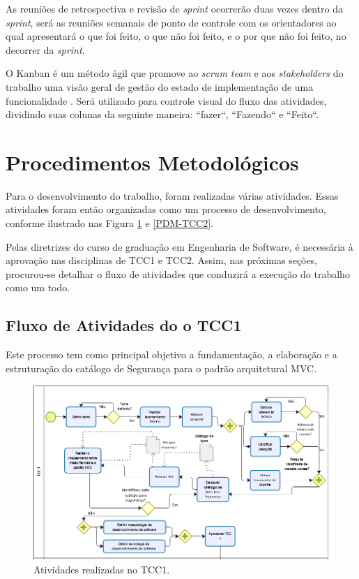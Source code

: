 As reuniões de retrospectiva e revisão de \textit{sprint} ocorrerão duas vezes dentro da \textit{sprint}, será as reuniões semanais   de ponto de controle com os orientadores ao qual apresentará o que foi feito, o que não foi feito, e o por que não foi feito, no decorrer da \textit{sprint}. 

O Kanban é um método ágil que promove ao \textit{scrum team} e aos \textit{stakeholders} do trabalho uma visão geral de gestão do estado de implementação de uma funcionalidade \cite{prikladnicki2014metodos}. Será utilizado para controle visual do fluxo das atividades, dividindo suas colunas da seguinte maneira: ``fazer``, ``Fazendo`` e ``Feito``.

\section{Procedimentos Metodológicos}
\label{sec:procedimentosMetodológicos}

Para o desenvolvimento do trabalho, foram realizadas várias atividades. Essas atividades foram então organizadas como um processo de desenvolvimento, conforme ilustrado nas Figura \ref{PDM-TCC1} e \ref{PDM-TCC2}. 

Pelas diretrizes do curso de graduação em Engenharia de Software, é necessária à aprovação nas disciplinas de TCC1 e TCC2. Assim, nas próximas seções, procurou-se detalhar o fluxo de atividades que conduzirá a execução do trabalho como um todo. 

\subsection{Fluxo de Atividades do o TCC1}

Este processo tem como principal objetivo a fundamentação, a elaboração e a estruturação do catálogo de Segurança para o padrão arquitetural MVC. 

\begin{figure}[h!]
	\centering
	\includegraphics[keepaspectratio=true,scale=0.6]{figuras/PDM-TCC1.PNG}
	\caption{Atividades realizadas no TCC1.}
	\label{PDM-TCC1}
\end{figure}

